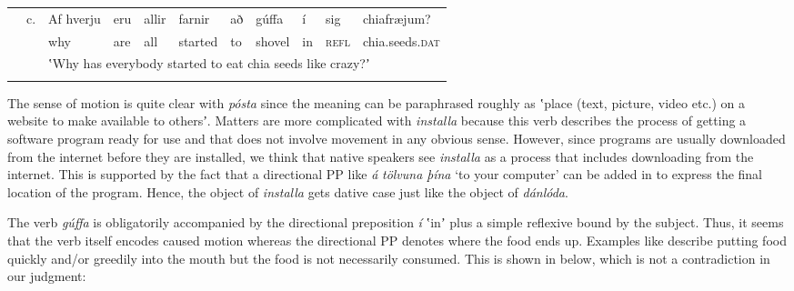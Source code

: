 \documentclass[output=paper,modfonts,nonflat]{langsci/langscibook}
\begin{document}
\tabletail{}
\tablelasttail{}
\begin{tabularx}{\textwidth}{XXXXXXXXXXX} & c. & Af hverju & eru & allir & farnir & að & gúffa & í & sig & chiafræjum?\\
\lsptoprule
&  & why & are & all & started & to & shovel & in & \textsc{refl} & chia.seeds.\textsc{dat}\\
&  & \multicolumn{9}{X}{ʽWhy has everybody started to eat chia seeds like crazy?ʼ}\\
\lspbottomrule
\end{tabularx}
The sense of motion is quite clear with \textit{pósta} since the meaning can be paraphrased roughly as ʽplace (text, picture, video etc.) on a website to make available to othersʼ. Matters are more complicated with \textit{installa} because this verb describes the process of getting a software program ready for use and that does not involve movement in any obvious sense. However, since programs are usually downloaded from the internet before they are installed, we think that native speakers see \textit{installa} as a process that includes downloading from the internet. This is supported by the fact that a directional PP like \textit{á} \textit{tölvuna} \textit{þína} ‘to your computer’ can be added in  to express the final location of the program. Hence, the object of \textit{installa} gets dative case just like the object of \textit{dánlóda}. 

The verb \textit{gúffa} is obligatorily accompanied by the directional preposition \textit{í} ʽinʼ plus a simple reflexive bound by the subject. Thus, it seems that the verb itself encodes caused motion whereas the directional PP denotes where the food ends up. Examples like  describe putting food quickly and/or greedily into the mouth but the food is not necessarily consumed. This is shown in  below, which is not a contradiction in our judgment: 

\tablefirsthead{}
\end{document}
